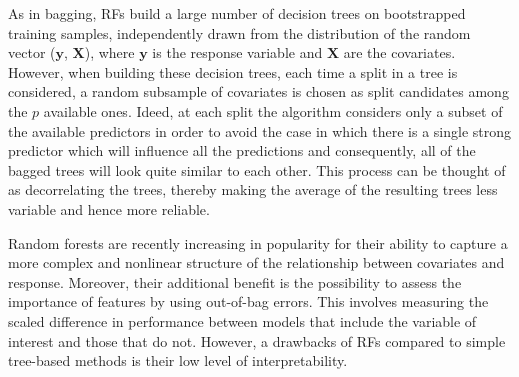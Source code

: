 As in bagging, RFs build a large number of decision trees on bootstrapped training samples, independently drawn from the distribution of the random vector (\(\bm{y}\), \(\bm{X}\)), where \(\bm{y}\) is the response variable and \(\bm{X}\) are the covariates. However, when building these decision trees, each time a split in a tree is considered, a random subsample of
covariates is chosen as split candidates among the \(p\) available ones.
Ideed, at each split the algorithm considers only a subset of the available predictors in order to avoid the case in which there is a single strong predictor which will influence all the predictions and consequently, all of the bagged trees will look quite similar to each other.
This process can be thought of as decorrelating the trees, thereby making the average of the resulting trees less variable and hence more reliable.

Random forests are recently increasing in popularity for their ability to capture a more complex and nonlinear structure of the relationship between covariates and response. 
Moreover, their additional benefit is the possibility to assess the importance of features by using out-of-bag errors. This involves measuring the scaled difference in performance between models that include the variable of interest and those that do not.
However, a drawbacks of RFs compared to simple tree-based methods is their low level of interpretability.

